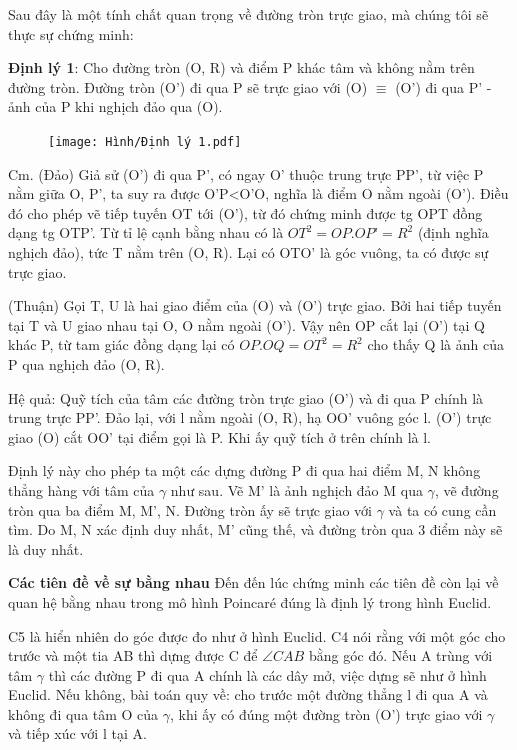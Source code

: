 \begin{multicols}{2}
	Sau đây là một tính chất quan trọng về đường tròn trực giao, mà chúng tôi sẽ thực sự chứng minh:
	
	\textbf{\color{lichsutoanhoc}Định lý 1}: Cho đường tròn (O, R) và điểm P khác tâm và không nằm trên đường tròn. Đường tròn (O’) đi qua P sẽ trực giao với (O) $ \equiv$ (O’) đi qua P’ - ảnh của P khi nghịch đảo qua (O).
	
	\begin{figure}[ht]
		\texttt{[image: Hình/Định lý 1.pdf]}
	\end{figure}
	
	
	Cm. (Đảo) Giả sử (O’) đi qua P’, có ngay O’ thuộc trung trực PP’, từ việc P nằm giữa O, P’, ta suy ra được O’P<O’O, nghĩa là điểm O nằm ngoài (O’). Điều đó cho phép vẽ tiếp tuyến OT tới (O’), từ đó chứng minh được tg OPT đồng dạng tg OTP’. Từ tỉ lệ cạnh bằng nhau có là $OT^2 = OP.OP’ = R^2$ (định nghĩa nghịch đảo), tức T nằm trên (O, R). Lại có OTO’ là góc vuông, ta có được sự trực giao.
	
	(Thuận) Gọi T, U là hai giao điểm của (O) và (O’) trực giao. Bởi hai tiếp tuyến tại T và U giao nhau tại O, O nằm ngoài (O’). Vậy nên OP cắt lại (O’) tại Q khác P, từ tam giác đồng dạng lại có $OP.OQ = OT^2 = R^2$ cho thấy Q là ảnh của P qua nghịch đảo (O, R).
	
	Hệ quả: Quỹ tích của tâm các đường tròn trực giao (O’) và đi qua P chính là trung trực PP’.
	Đảo lại, với l nằm ngoài (O, R), hạ OO’ vuông góc l. (O’) trực giao (O) cắt OO’ tại điểm gọi là P. Khi ấy quỹ tích ở trên chính là l.
	
	Định lý này cho phép ta một các dựng đường P đi qua hai điểm M, N không thẳng hàng với tâm của $\gamma$ như sau. Vẽ M’ là ảnh nghịch đảo M qua $\gamma$, vẽ đường tròn qua ba điểm M, M’, N. Đường tròn ấy sẽ trực giao với $\gamma$ và ta có cung cần tìm. Do M, N xác định duy nhất, M’ cũng thế, và đường tròn qua 3 điểm này sẽ là duy nhất.
	
	\textbf{\color{lichsutoanhoc}Các tiên đề về sự bằng nhau}
	Đến đến lúc chứng minh các tiên đề còn lại về quan hệ bằng nhau trong mô hình Poincaré đúng là định lý trong hình Euclid.
	
	C5 là hiển nhiên do góc được đo như ở hình Euclid. C4 nói rằng với một góc cho trước và một tia AB thì dựng được C để $ \angle CAB$ bằng góc đó. Nếu A trùng với tâm $ \gamma$ thì các đường P đi qua A chính là các dây mở, việc dựng sẽ như ở hình Euclid.
	Nếu không, bài toán quy về: cho trước một đường thẳng l đi qua A và không đi qua tâm O của $\gamma$, khi ấy có đúng một đường tròn (O’) trực giao với $\gamma$ và tiếp xúc với l tại A. 
	

\end{multicols}
